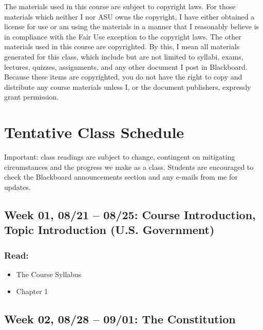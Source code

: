 \documentclass[11pt,]{article}
\begin{document}
The materials used in this course are subject to copyright laws. For
those materials which neither I nor ASU owns the copyright, I have
either obtained a license for use or am using the materials in a manner
that I reasonably believe is in compliance with the Fair Use exception
to the copyright laws. The other materials used in this course are
copyrighted. By this, I mean all materials generated for this class,
which include but are not limited to syllabi, exams, lectures, quizzes,
assignments, and any other document I post in Blackboard. Because these
items are copyrighted, you do not have the right to copy and distribute
any course materials unless I, or the document publishers, expressly
grant permission.

\newpage

\hypertarget{tentative-class-schedule}{%
\section{Tentative Class Schedule}\label{tentative-class-schedule}}

Important: class readings are subject to change, contingent on
mitigating circumstances and the progress we make as a class. Students
are encouraged to check the Blackboard announcements section and any
e-mails from me for updates.

\hypertarget{week-01-0821-0825-course-introduction-topic-introduction-u.s.-government}{%
\subsection{Week 01, 08/21 -- 08/25: Course Introduction, Topic
Introduction (U.S.
Government)}\label{week-01-0821-0825-course-introduction-topic-introduction-u.s.-government}}

\hypertarget{read}{%
\subsubsection{Read:}\label{read}}

\begin{itemize}
\item
  The Course Syllabus
\item
  Chapter 1
\end{itemize}

\hypertarget{week-02-0828-0901-the-constitution}{%
\subsection{Week 02, 08/28 -- 09/01: The
Constitution}\label{week-02-0828-0901-the-constitution}}
\end{document}
